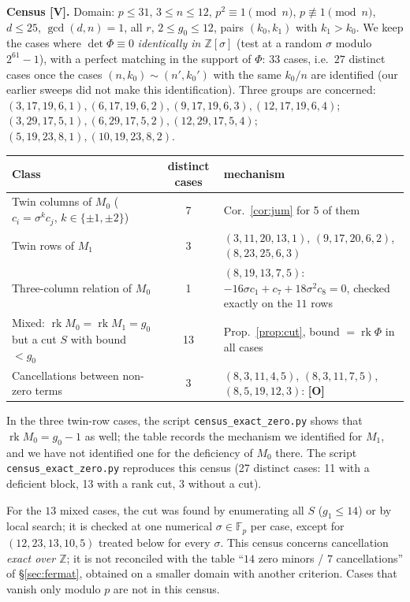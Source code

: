 \documentclass[11pt,a4paper]{article}
\newcommand{\F}{\mathbb{F}}
\begin{document}
\medskip\noindent\textbf{Census [V].} Domain: $p\le31$, $3\le n\le12$,
$p^2\equiv1\pmod n$, $p\not\equiv1\pmod n$, $d\le25$, $\gcd(d,n)=1$, all $r$,
$2\le g_0\le12$, pairs $(k_0,k_1)$ with $k_1>k_0$. We keep the cases where
$\det\Phi\equiv0$ \emph{identically in $\mathbb Z[\sigma]$} (test at a random
$\sigma$ modulo $2^{61}-1$), with a perfect matching in the support of $\Phi$:
$33$ cases, i.e.\ $27$ distinct cases once the cases $(n,k_0)\sim(n',k_0')$ with
the same $k_0/n$ are identified (our earlier sweeps did not make this
identification). Three groups are concerned: $(3,17,19,6,1),(6,17,19,6,2),
(9,17,19,6,3),(12,17,19,6,4)$; $(3,29,17,5,1),(6,29,17,5,2),(12,29,17,5,4)$;
$(5,19,23,8,1),(10,19,23,8,2)$.

\begin{center}
\begin{tabular}{lcl}
Class & distinct cases & mechanism\\\hline
Twin columns of $M_0$ ($c_i=\sigma^kc_j$, $k\in\{\pm1,\pm2\}$) & 7 & Cor.~\ref{cor:jum} for 5 of them\\
Twin rows of $M_1$ & 3 & $(3,11,20,13,1)$, $(9,17,20,6,2)$, $(8,23,25,6,3)$\\
Three-column relation of $M_0$ & 1 & $(8,19,13,7,5)$: $-16\sigma c_1+c_7+18\sigma^2c_8=0$, checked exactly on the $11$ rows\\
Mixed: $\operatorname{rk}M_0=\operatorname{rk}M_1=g_0$ but a cut $S$ with bound $<g_0$ & 13 & Prop.~\ref{prop:cut}, bound $=\operatorname{rk}\Phi$ in all cases\\
Cancellations between non-zero terms & 3 & $(8,3,11,4,5)$, $(8,3,11,7,5)$, $(8,5,19,12,3)$: \textbf{[O]}\\
\end{tabular}
\end{center}
In the three twin-row cases, the script \texttt{census\_exact\_zero.py} shows that $\operatorname{rk}M_0=g_0-1$ as well; the table records the mechanism we identified for $M_1$, and we have not identified one for the deficiency of $M_0$ there. The script \texttt{census\_exact\_zero.py} reproduces this census (27 distinct cases: 11 with a deficient block, 13 with a rank cut, 3 without a cut).

For the $13$ mixed cases, the cut was found by enumerating all $S$ ($g_1\le14$) or
by local search; it is checked at one numerical $\sigma\in\F_p$ per case, except
for $(12,23,13,10,5)$ treated below for every $\sigma$. This census concerns
cancellation \emph{exact over $\mathbb Z$}; it is not reconciled with the table
``$14$ zero minors / $7$ cancellations'' of \S\ref{sec:fermat}, obtained on a
smaller domain with another criterion. Cases that vanish only modulo $p$ are not
in this census.
\end{document}
